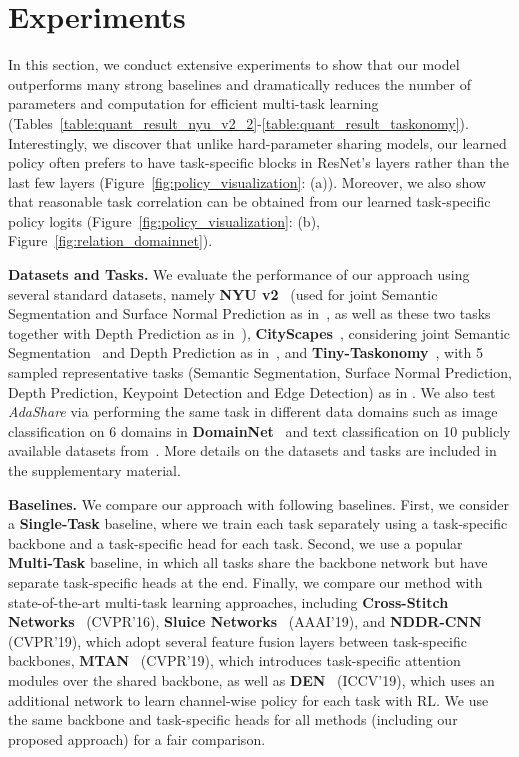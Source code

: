 \section{Experiments} \label{sec:experiments}
In this section, we 
conduct extensive experiments to show that our model outperforms many strong baselines
and dramatically reduces the number of parameters and computation for efficient multi-task learning (Tables~\ref{table:quant_result_nyu_v2_2}-\ref{table:quant_result_taskonomy}). 
Interestingly, we discover that unlike hard-parameter sharing models, our learned policy often prefers to have task-specific blocks in ResNet's  layers rather than the last few layers (Figure~\ref{fig:policy_visualization}: (a)). 
Moreover, we also show that reasonable task correlation can be obtained from our learned task-specific policy logits (Figure~\ref{fig:policy_visualization}: (b), Figure~\ref{fig:relation_domainnet}). 

\noindent\textbf{Datasets and Tasks.} We evaluate the performance of our approach using several standard  datasets, namely \textbf{NYU v2}~\cite{Silberman:ECCV12} (used for joint Semantic Segmentation and Surface Normal Prediction as in~\cite{Misra16,gao2019nddr}, as well as these two tasks together with Depth Prediction as in~\cite{liu2019end}),  \textbf{CityScapes}~\cite{cordts2016cityscapes}, considering joint Semantic Segmentation~\cite{chen2017deeplab, tao2020hierarchical, hu2020real, Hu_2020_CVPR} and Depth Prediction as in~\cite{liu2019end},
and \textbf{Tiny-Taskonomy}~\cite{zamir2018taskonomy},
with 5 sampled representative tasks (Semantic Segmentation, Surface Normal Prediction, Depth Prediction, Keypoint Detection and Edge Detection)
as in \cite{standley2019tasks}. We also test \textit{AdaShare} via performing the same task in different data domains such as image classification on 6 domains in \textbf{DomainNet}~\cite{peng2019moment} and text classification on 10 publicly available datasets from~\cite{chen2018exploring}.
More details on the datasets and tasks are included in the supplementary material.


\noindent\textbf{Baselines.} We compare our approach with following baselines. First, we consider a \textbf{Single-Task} baseline, where we train each task separately using a task-specific backbone and a task-specific head for each task.
Second, we use a popular \textbf{Multi-Task} baseline, in which all tasks share the backbone network but have separate task-specific heads at the end. Finally, we compare our method with state-of-the-art multi-task learning approaches, including \textbf{Cross-Stitch Networks}~\cite{Misra16} (CVPR'16), \textbf{Sluice Networks}~\cite{ruder122017sluice} (AAAI'19), and \textbf{NDDR-CNN}~\cite{gao2019nddr} (CVPR'19), which adopt several feature fusion layers between task-specific backbones, 
\textbf{MTAN}~\cite{liu2019end} (CVPR'19), which introduces task-specific attention modules over the shared backbone, as well as \textbf{DEN}~\cite{ahn2019deep} (ICCV'19), which uses an additional network to learn channel-wise policy for each task with RL. 
We use the same backbone and task-specific heads for all methods (including our proposed approach) for a fair comparison. 


